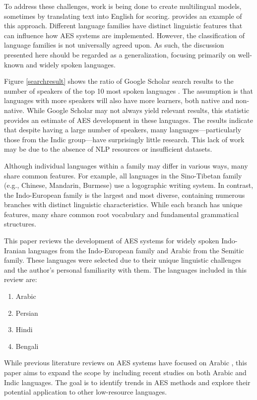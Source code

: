\documentclass{article}
\begin{document}
	To address these challenges, work is being done to create multilingual models, sometimes by translating text into English for scoring. \textcite{firoozi2024bert} provides an example of this approach. Different language families have distinct linguistic features that can influence how AES systems are implemented. However, the classification of language families is not universally agreed upon. As such, the discussion presented here should be regarded as a generalization, focusing primarily on well-known and widely spoken languages.
	
	Figure \ref{searchresult} shows the ratio of Google Scholar search results to the number of speakers of the top 10 most spoken languages \cite{wikitotalspeakers}. The assumption is that languages with more speakers will also have more learners, both native and non-native. While Google Scholar may not always yield relevant results, this statistic provides an estimate of AES development in these languages. The results indicate that despite having a large number of speakers, many languages—particularly those from the Indic group—have surprisingly little research. This lack of work may be due to the absence of NLP resources or insufficient datasets.
	
	Although individual languages within a family may differ in various ways, many share common features. For example, all languages in the Sino-Tibetan family (e.g., Chinese, Mandarin, Burmese) use a logographic writing system. In contrast, the Indo-European family is the largest and most diverse, containing numerous branches with distinct linguistic characteristics. While each branch has unique features, many share common root vocabulary and fundamental grammatical structures.
	
	This paper reviews the development of AES systems for widely spoken Indo-Iranian languages from the Indo-European family and Arabic from the Semitic family. These languages were selected due to their unique linguistic challenges and the author’s personal familiarity with them. The languages included in this review are:
	\begin{enumerate}
		\item Arabic
		\item Persian
		\item Hindi
		\item Bengali
	\end{enumerate}
	
	While previous literature reviews on AES systems have focused on Arabic \cite{litreviewarabic}, this paper aims to expand the scope by including recent studies on both Arabic and Indic languages. The goal is to identify trends in AES methods and explore their potential application to other low-resource languages.
	
\end{document}

